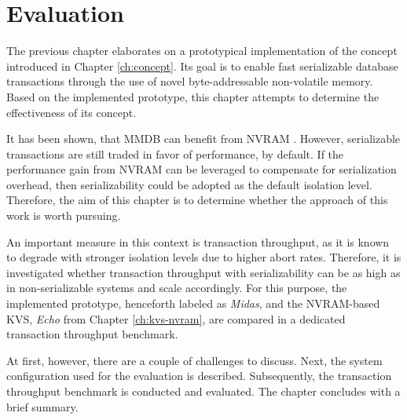 \chapter{Evaluation}
\label{ch:eval}

The previous chapter elaborates on a prototypical implementation of the concept
introduced in Chapter \ref{ch:concept}. Its goal is to enable fast serializable
database transactions through the use of novel byte-addressable non-volatile
memory. Based on the implemented prototype, this chapter attempts to determine
the effectiveness of its concept.

It has been shown, that MMDB can benefit from NVRAM \cite{bailey2013exploring,
schwalb2016hyrise, oukid2017data, andrei2017sap}. However, serializable
transactions are still traded in favor of performance, by default. If the
performance gain from NVRAM can be leveraged to compensate for serialization
overhead, then serializability could be adopted as the default isolation level.
Therefore, the aim of this chapter is to determine whether the approach of this
work is worth pursuing.

An important measure in this context is transaction throughput, as it is known
to degrade with stronger isolation levels due to higher abort rates. Therefore,
it is investigated whether transaction throughput with serializability can be as
high as in non-serializable systems and scale accordingly. For this purpose, the
implemented prototype, henceforth labeled as \emph{Midas}\footnotemark, and the
NVRAM-based KVS, \emph{Echo} from Chapter \ref{ch:kvs-nvram}, are compared in a
dedicated transaction throughput benchmark.



At first, however, there are a couple of challenges to discuss. Next, the system
configuration used for the evaluation is described. Subsequently, the
transaction throughput benchmark is conducted and evaluated. The chapter
concludes with a brief summary.


